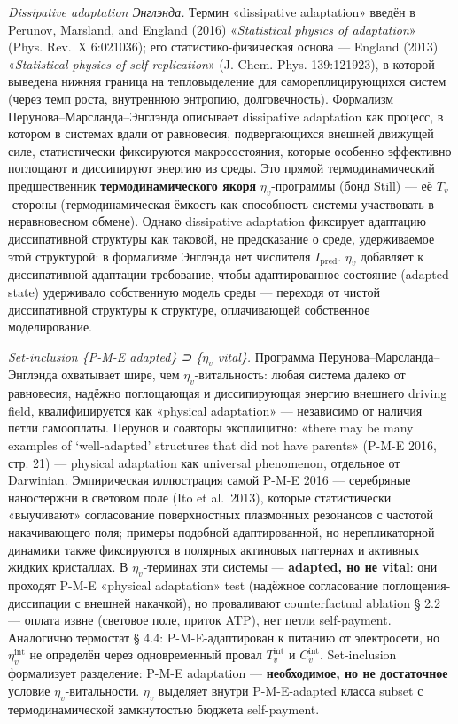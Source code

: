 \documentclass[pdflatex,sn-mathphys-ay]{sn-jnl}
\begin{document}
\emph{Dissipative adaptation Энглэнда.} Термин «dissipative adaptation» введён в Perunov, Marsland, and England (2016) «\emph{Statistical physics of adaptation}» (Phys. Rev.~X 6:021036); его статистико-физическая основа --- England (2013) «\emph{Statistical physics of self-replication}» (J. Chem. Phys. 139:121923), в которой выведена нижняя граница на тепловыделение для самореплицирующихся систем (через темп роста, внутреннюю энтропию, долговечность). Формализм Перунова--Марсланда--Энглэнда описывает dissipative adaptation как процесс, в котором в системах вдали от равновесия, подвергающихся внешней движущей силе, статистически фиксируются макросостояния, которые особенно эффективно поглощают и диссипируют энергию из среды. Это прямой термодинамический предшественник \textbf{термодинамического якоря} \(\eta_v\)-программы (бонд Still) --- её \(T_v\)-стороны (термодинамическая ёмкость как способность системы участвовать в неравновесном обмене). Однако dissipative adaptation фиксирует адаптацию диссипативной структуры как таковой, не предсказание о среде, удерживаемое этой структурой: в формализме Энглэнда нет числителя \(I_{\text{pred}}\). \(\eta_v\) добавляет к диссипативной адаптации требование, чтобы адаптированное состояние (adapted state) удерживало собственную модель среды --- переходя от чистой диссипативной структуры к структуре, оплачивающей собственное моделирование.

\emph{Set-inclusion \{P-M-E adapted\} ⊃ \{\(\eta_v\) vital\}.} Программа Перунова--Марсланда--Энглэнда охватывает шире, чем \(\eta_v\)-витальность: любая система далеко от равновесия, надёжно поглощающая и диссипирующая энергию внешнего driving field, квалифицируется как «physical adaptation» --- независимо от наличия петли самооплаты. Перунов и соавторы эксплицитно: «there may be many examples of `well-adapted' structures that did not have parents» (P-M-E 2016, стр. 21) --- physical adaptation как universal phenomenon, отдельное от Darwinian. Эмпирическая иллюстрация самой P-M-E 2016 --- серебряные наностержни в световом поле (Ito et al.~2013), которые статистически «выучивают» согласование поверхностных плазмонных резонансов с частотой накачивающего поля; примеры подобной адаптированной, но нерепликаторной динамики также фиксируются в полярных актиновых паттернах и активных жидких кристаллах. В \(\eta_v\)-терминах эти системы --- \textbf{adapted, но не vital}: они проходят P-M-E «physical adaptation» test (надёжное согласование поглощения-диссипации с внешней накачкой), но проваливают counterfactual ablation § 2.2 --- оплата извне (световое поле, приток ATP), нет петли self-payment. Аналогично термостат § 4.4: P-M-E-адаптирован к питанию от электросети, но \(\eta_v^{\text{int}}\) не определён через одновременный провал \(T_v^{\text{int}}\) и \(C_v^{\text{int}}\). Set-inclusion формализует разделение: P-M-E adaptation --- \textbf{необходимое, но не достаточное} условие \(\eta_v\)-витальности. \(\eta_v\) выделяет внутри P-M-E-adapted класса subset с термодинамической замкнутостью бюджета self-payment.
\end{document}
